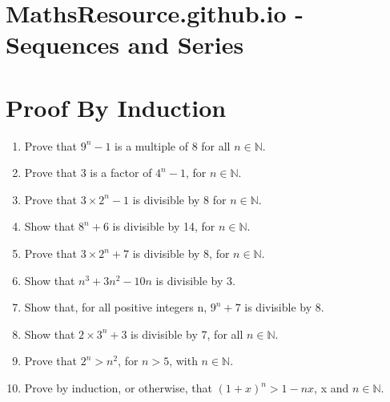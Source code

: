 \documentclass[]{report}
\begin{document}
\section*{MathsResource.github.io - Sequences and Series}	
\section*{Proof By Induction}

\begin{enumerate}
\item Prove that $9^{n} - 1$ is a multiple of 8 for all $n \in \mathbb{N}.$
\item Prove that 3 is a factor of $4^{n} - 1$, for $n \in \mathbb{N}.$
\item Prove that $3\times 2^{n} - 1$ is divisible by 8 for $n \in \mathbb{N}.$
\item Show that $8^{n} + 6$ is divisible by 14, for $n \in \mathbb{N}.$
\item Prove that $3\times 2^{n} + 7$ is divisible by 8, for $n \in \mathbb{N}.$
\item Show that $n^3 + 3n^2 - 10n$ is divisible by 3. 

\item Show that, for all positive integers n, $9^{n} + 7$ is divisible by 8. 
\item  Show that $2\times 3^{n} + 3$ is divisible by 7, for all $n \in \mathbb{N}.$
\item  Prove that $2^{n} > n^2$, for $n > 5$, with $n \in \mathbb{N}.$
\item Prove by induction, or otherwise, that $(1 + x)^{n} >1 - nx$, x and $n \in \mathbb{N}$. 

\end{enumerate}
\end{document}
